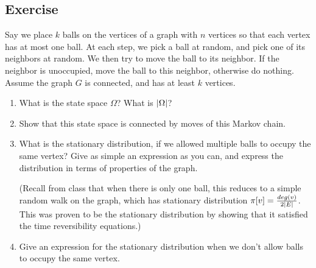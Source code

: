 \documentclass{article}
\newcounter{counter}
\newcommand{\Exercise}{Exercise \stepcounter{counter}\thecounter}
\DeclarePairedDelimiter\abs{\lvert}{\rvert}%
\begin{document}
\subsection*{\Exercise}
  Say we place $k$ balls on the vertices of a graph with $n$ vertices so
  that each vertex has at most one ball. At each step, we
  pick a ball at random, and pick one of its neighbors at random.
  We then try to move the ball to its neighbor. If the neighbor is
  unoccupied, move the ball to this neighbor, otherwise do nothing. Assume
  the graph $G$ is connected, and has at least $k$ vertices.
  \begin{enumerate}
    \item What is the state space $\Omega$? What is $\abs{\Omega}$?
    \item Show that this state space is connected by moves of this Markov
      chain.
    \item What is the stationary distribution, if we allowed multiple balls
      to occupy the same vertex?  Give as simple an expression as you can,
      and express the distribution in terms of properties of the graph.

      (Recall from class that when there is only one ball, this reduces to a
      simple random walk on the graph, which has stationary distribution
      $\pi[v] = \frac{deg(v)}{2\abs{E}}$. This was proven to be the
      stationary distribution by showing that it satisfied the time
      reversibility equations.)
    \item Give an expression for the stationary distribution when we don't
      allow balls to occupy the same vertex.
  \end{enumerate}
\end{document}
